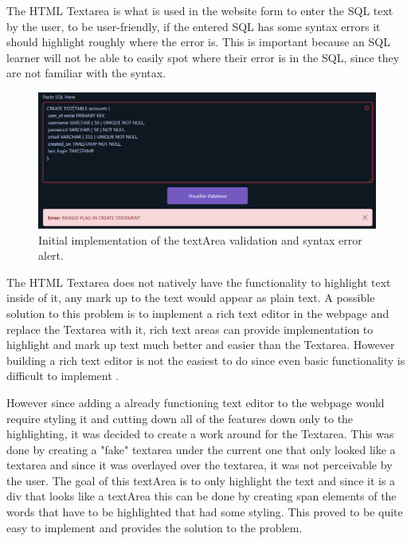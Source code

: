 The HTML Textarea is what is used in the website form to enter the SQL text by the user, to be user-friendly, if the entered SQL has some syntax errors it should highlight roughly where the error is. This is important because an SQL learner will not be able to easily spot where their error is in the SQL, since they are not familiar with the syntax. 

\begin{figure}[h!]
	\centering
	\includegraphics[width=\textwidth]{textArea}
	\caption{Initial implementation of the textArea validation and syntax error alert.}
	\label{fig:textArea}
\end{figure}

The HTML Textarea does not natively have the functionality to highlight text inside of it, any mark up to the text would appear as plain text. A possible solution to this problem is to implement a rich text editor in the webpage and replace the Textarea with it, rich text areas can provide implementation to highlight and mark up text much better and easier than the Textarea. However building a rich text editor is not the easiest to do since even basic functionality is difficult to implement \cite{highlightText}.

However since adding a already functioning text editor to the webpage would require styling it and cutting down all of the features down only to the highlighting, it was decided to create a work around for the Textarea. This was done by creating a "fake" textarea under the current one that only looked like a textarea and since it was overlayed over the textarea, it was not perceivable by the user. The goal of this textArea is to only highlight the text and since it is a div that looks like a textArea this can be done by creating span elements of the words that have to be highlighted that had some styling. This proved to be quite easy to implement and provides the solution to the problem.

